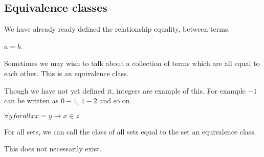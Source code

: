
\subsection{Equivalence classes}

We have already ready defined the relationship equality, between terms.

\(a=b\).

Sometimes we may wish to talk about a collection of terms which are all equal to each other. This is an equivalence class.

Though we have not yet defined it, integers are example of this. For example \(-1\) can be written as \(0-1\), \(1-2\) and so on.

\(\forall y forall x x=y\rightarrow x\in z\)

For all sets, we can call the class of all sets equal to the set an equivalence class.

This does not necessarily exist.

